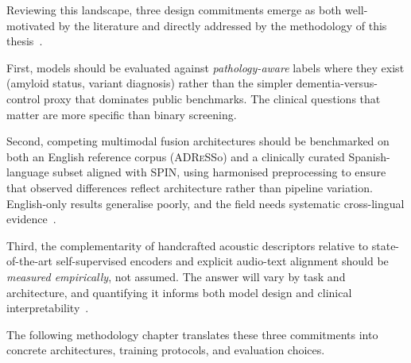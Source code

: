Reviewing this landscape, three design commitments emerge as both well-motivated by the literature and directly addressed by the methodology of this thesis~\cite{esteve2025speechadppa}.

First, models should be evaluated against \emph{pathology-aware} labels where they exist (amyloid status, variant diagnosis) rather than the simpler dementia-versus-control proxy that dominates public benchmarks.
The clinical questions that matter are more specific than binary screening.

Second, competing multimodal fusion architectures should be benchmarked on both an English reference corpus (\textsc{ADReSS}o) and a clinically curated Spanish-language subset aligned with SPIN, using harmonised preprocessing to ensure that observed differences reflect architecture rather than pipeline variation.
English-only results generalise poorly, and the field needs systematic cross-lingual evidence~\cite{ding2024speechsurvey,pugalenthi2024bilingualppa}.

Third, the complementarity of handcrafted acoustic descriptors relative to state-of-the-art self-supervised encoders and explicit audio-text alignment should be \emph{measured empirically}, not assumed.
The answer will vary by task and architecture, and quantifying it informs both model design and clinical interpretability~\cite{ortiz2025cognialign,ntampakis2025neuroxvocal}.

The following methodology chapter translates these three commitments into concrete architectures, training protocols, and evaluation choices.
